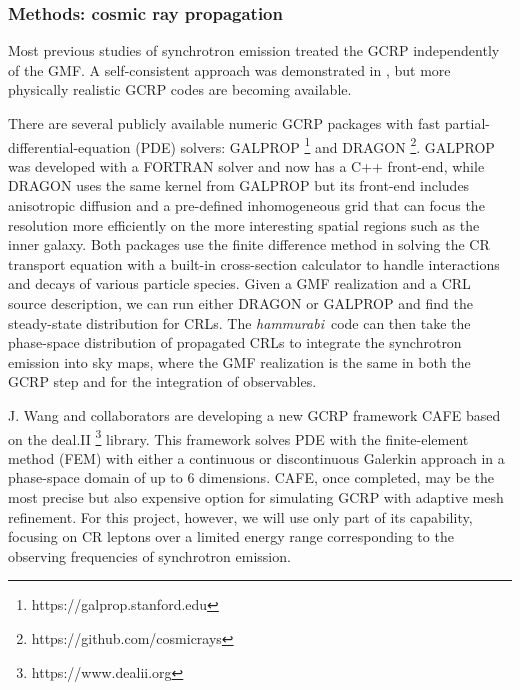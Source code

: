 \documentclass[12pt]{article}
\newcommand{\hammurabi}{\textsl{hammurabi}}
\newcommand{\hammurabix}{\textsl{hammurabi\,X}}
\begin{document}


\subsubsection*{Methods: cosmic ray propagation}

Most previous studies of synchrotron emission treated the GCRP independently of the GMF.  A self-consistent approach was demonstrated in \cite{jaffe:2011}, but more physically realistic GCRP codes are becoming available.  

There are several publicly available numeric GCRP packages with fast partial-differential-equation (PDE) solvers:  GALPROP \footnote{https://galprop.stanford.edu} and DRAGON \footnote{https://github.com/cosmicrays}.
GALPROP was developed with a FORTRAN solver and now has a C++ front-end, while DRAGON uses the same kernel from GALPROP but its front-end includes anisotropic diffusion and a pre-defined inhomogeneous grid that can focus the resolution more efficiently on the more interesting spatial regions such as the inner galaxy.
Both packages use the finite difference method in solving the CR transport equation with a built-in cross-section calculator to handle interactions and decays of various particle species.
Given a GMF realization and a CRL source description, we can run either DRAGON or GALPROP and find the steady-state distribution for CRLs.
The \hammurabi\ code can then take the phase-space distribution of propagated CRLs to integrate the synchrotron emission into sky maps, where the GMF realization is the same in both the GCRP step and for the integration of observables.  

J. Wang and collaborators are developing a new GCRP framework CAFE based on the deal.II \footnote{https://www.dealii.org} library. 
This framework solves PDE with the finite-element method (FEM) with either a  continuous or discontinuous Galerkin approach in a phase-space domain of up to 6 dimensions.
CAFE, once completed, may be the most precise but also expensive option for simulating GCRP with adaptive mesh refinement.  For this project, however, we will use only part of its capability, focusing on CR leptons over a limited energy range corresponding to the observing frequencies of synchrotron emission.  
\end{document}
